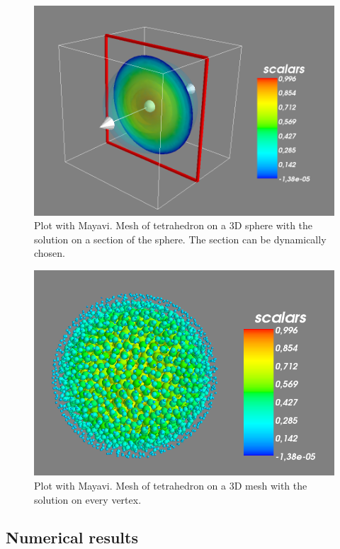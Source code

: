 \begin{figure}[!h]
\label{img:matplotlibMesh}
\centering
\includegraphics[scale=0.35]{images/mayavi3D.png}
\caption{Plot with Mayavi. Mesh of tetrahedron on a $3$D sphere with the solution on a section of the sphere. The section can be dynamically chosen.}
\end{figure}

\begin{figure}[!h]
\label{img:matplotlibMesh}
\centering
\includegraphics[scale=0.4]{images/mayavi3DPoints.png}
\caption{Plot with Mayavi. Mesh of tetrahedron on a $3$D mesh with the solution on every vertex.}
\end{figure}

\subsection{Numerical results}